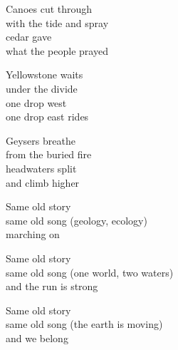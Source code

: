 \begin{lyrics}
Canoes cut through\\
with the tide and spray\\
cedar gave\\
what the people prayed

Yellowstone waits\\
under the divide\\
one drop west\\
one drop east rides

Geysers breathe\\
from the buried fire\\
headwaters split\\
and climb higher

Same old story\\
same old song
(geology, ecology)\\
marching on

Same old story\\
same old song
(one world, two waters)\\
and the run is strong

Same old story\\
same old song
(the earth is moving)\\
and we belong
\end{lyrics}

